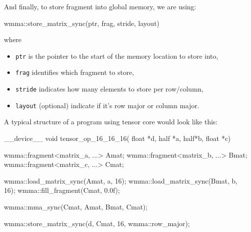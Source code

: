 \begin{tcolorbox}[violet]
            And finally, to store fragment into global memory, we are using:
            \begin{codeCenter}
            \begin{Ccode}
wmma::store_matrix_sync(ptr, frag, stride, layout)
            \end{Ccode}
            \end{codeCenter}
            where
            \begin{itemize}[left=10pt, label=\textbullet]
                \item \texttt{ptr} is the pointer to the start of the memory location to store into, 
                \item \texttt{frag} identifies which fragment to store, 
                \item \texttt{stride} indicates how many elements to store per row/column,
                \item \texttt{layout} (optional) indicate if it's row major or column major. 
            \end{itemize}
        \end{tcolorbox}
        A typical structure of a program using tensor core would look like this:
        \begin{codeCenter}
        \begin{Ccode}
__device__ void tensor_op_16_16_16(
    float *d, half *a, half*b, float *c)
{
    wmma::fragment<matrix_a, ...> Amat;
    wmma::fragment<matrix_b, ...> Bmat;
    wmma::fragment<matrix_c, ...> Cmat;

    wmma::load_matrix_sync(Amat, a, 16);
    wmma::load_matrix_sync(Bmat, b, 16);
    wmma::fill_fragment(Cmat, 0.0f);

    wmma::mma_sync(Cmat, Amat, Bmat, Cmat);
    
    wmma::store_matrix_sync(d, Cmat, 16, wmma::row_major);
}
        \end{Ccode}
        \end{codeCenter}
        
        
        
   
    
    
 
